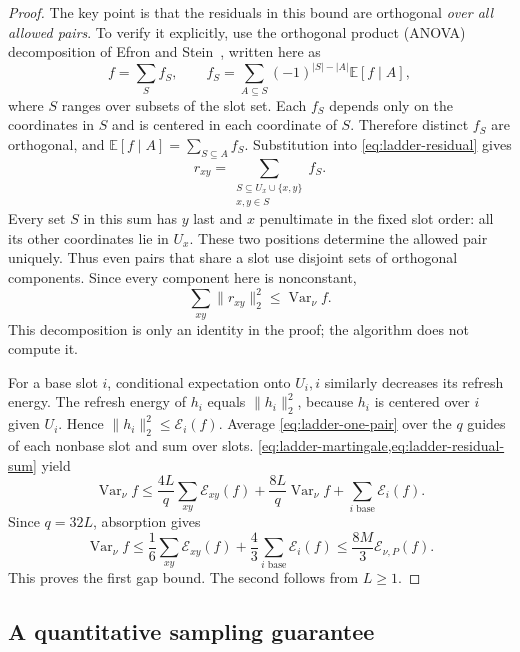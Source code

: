 \documentclass[11pt]{article}
\theoremstyle{definition}
\theoremstyle{remark}
\newcommand{\E}{\mathbb E}
\DeclareMathOperator{\Var}{Var}
\newcommand{\calE}{\mathcal E}
\numberwithin{equation}{section}
\begin{document}
\begin{proof}
The key point is that the residuals in this bound are orthogonal
\emph{over all allowed pairs}. To verify it explicitly, use the
orthogonal product (ANOVA) decomposition
of Efron and Stein~\cite[Section~2]{EfronStein1981}, written here as
\[
 f=\sum_{S}f_S,\qquad
 f_S=\sum_{A\subseteq S}(-1)^{|S|-|A|}\E[f\mid A],
\]
where $S$ ranges over subsets of the slot set.
Each $f_S$ depends only on the coordinates in $S$ and is centered in
each coordinate of $S$. Therefore distinct $f_S$ are orthogonal, and
$\E[f\mid A]=\sum_{S\subseteq A}f_S$.
Substitution into \cref{eq:ladder-residual} gives
\begin{equation}\label{eq:ladder-anova}
 r_{xy}=\sum_{\substack{S\subseteq U_x\cup\{x,y\}\\x,y\in S}}f_S.
\end{equation}
Every set $S$ in this sum has $y$ last and $x$ penultimate in the
fixed slot order: all its other coordinates lie in $U_x$. These two
positions determine the allowed pair uniquely. Thus even pairs that
share a slot use disjoint sets of orthogonal components. Since every
component here is nonconstant,
\begin{equation}\label{eq:ladder-residual-sum}
 \sum_{xy}\|r_{xy}\|_2^2\le\Var_\nu f.
\end{equation}
This decomposition is only an identity in the proof; the algorithm
does not compute it.

For a base slot $i$, conditional expectation onto $U_i,i$ similarly
decreases its refresh energy. The refresh energy of $h_i$ equals
$\|h_i\|_2^2$, because $h_i$ is centered over $i$ given $U_i$.
Hence $\|h_i\|_2^2\le\calE_i(f)$.
Average \cref{eq:ladder-one-pair} over the $q$ guides of each nonbase
slot and sum over slots.
\cref{eq:ladder-martingale,eq:ladder-residual-sum} yield
\[
 \Var_\nu f
 \le\frac{4L}{q}\sum_{xy}\calE_{xy}(f)
       +\frac{8L}{q}\Var_\nu f
       +\sum_{i\text{ base}}\calE_i(f).
\]
Since $q=32L$, absorption gives
\[
 \Var_\nu f
 \le\frac16\sum_{xy}\calE_{xy}(f)
       +\frac43\sum_{i\text{ base}}\calE_i(f)
 \le\frac{8M}{3}\calE_{\nu,P}(f).
\]
This proves the first gap bound. The second follows from $L\ge1$.
\end{proof}

\subsection{A quantitative sampling guarantee}
\end{document}
